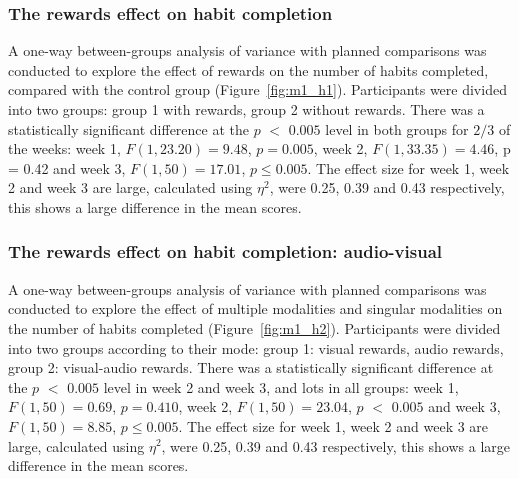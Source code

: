\documentclass{scaffold/sigchi}
\begin{document}
\subsubsection{The rewards effect on habit completion}
A one-way between-groups analysis of variance with planned comparisons was conducted to explore the effect of rewards on the number of habits completed, compared with the control group (Figure~\ref{fig:m1_h1}). Participants were divided into two groups: group 1 with rewards, group 2 without rewards. There was a statistically significant difference at the $p$ $<$ $0.005$ level in both groups for $2$$/$$3$ of the weeks: week 1, $F(1,23.20) = 9.48$, $p = 0.005$, week 2, $F(1,33.35) = 4.46$, p = 0.42 and week 3, $F(1,50) = 17.01$, $p\leq 0.005$. The effect size for week 1, week 2 and week 3 are large, calculated using $\eta^{2}$, were 0.25, 0.39 and 0.43 respectively, this shows a large difference in the mean scores.

\subsubsection{The rewards effect on habit completion: audio-visual}
A one-way between-groups analysis of variance with planned comparisons was conducted to explore the effect of multiple modalities and singular modalities on the number of habits completed (Figure~\ref{fig:m1_h2}). Participants were divided into two groups according to their mode: group 1: visual rewards, audio rewards, group 2: visual-audio rewards. There was a statistically significant difference at the $p$ $<$ $0.005$ level in week 2 and week 3, and lots in all groups: week 1, $F(1,50) = 0.69$, $p = 0.410$, week 2, $F(1,50) = 23.04$, $p$ $<$ $0.005$ and week 3, $F(1,50) = 8.85$, $p\leq 0.005$. The effect size for week 1, week 2 and week 3 are large, calculated using $\eta^{2}$, were 0.25, 0.39 and 0.43 respectively, this shows a large difference in the mean scores.
\end{document}
